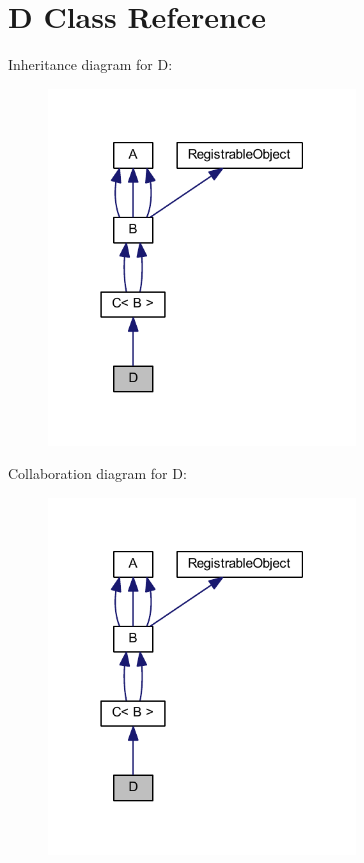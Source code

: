 \hypertarget{class_d}{
\section{D Class Reference}
\label{class_d}
}


Inheritance diagram for D:\nopagebreak
\begin{figure}[H]
\begin{center}
\leavevmode
\includegraphics[width=231pt]{class_d__inherit__graph}
\end{center}
\end{figure}


Collaboration diagram for D:\nopagebreak
\begin{figure}[H]
\begin{center}
\leavevmode
\includegraphics[width=231pt]{class_d__coll__graph}
\end{center}
\end{figure}
